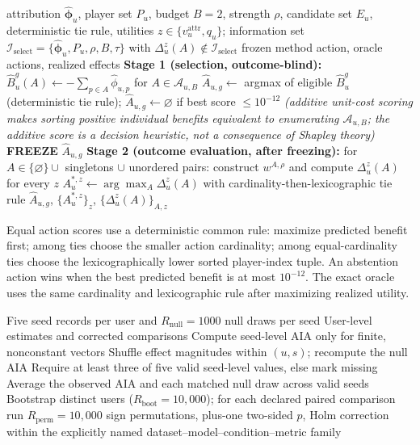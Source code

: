\documentclass[a4paper,fleqn,doubleblind]{cas-sc}
\begin{document}
\begin{algorithm}[t]
\caption{Leakage-free signed action selection and exact budget-two oracle}
\label{alg:actions}
\begin{algorithmic}[1]
\Require attribution $\hat{\boldsymbol\phi}_u$, player set $P_u$, budget $B=2$, strength $\rho$, candidate set $E_u$, deterministic tie rule, utilities $z\in\{v_u^{\mathrm{attr}},q_u\}$; information set $\mathcal I_{\mathrm{select}}=\{\hat{\boldsymbol\phi}_u,P_u,\rho,B,\tau\}$ with $\Delta_u^z(A)\notin\mathcal I_{\mathrm{select}}$
\Ensure frozen method action, oracle actions, realized effects
\State \textbf{Stage 1 (selection, outcome-blind):} $\widehat B_u^g(A)\gets-\sum_{p\in A}\hat\phi_{u,p}$ for $A\in\mathcal A_{u,B}$
\State $\widehat A_{u,g}\gets$ argmax of eligible $\widehat B_u^g$ (deterministic tie rule); $\widehat A_{u,g}\gets\varnothing$ if best score $\le10^{-12}$
\Statex\hspace{1em}\textit{(additive unit-cost scoring makes sorting positive individual benefits equivalent to enumerating $\mathcal A_{u,B}$; the additive score is a decision heuristic, not a consequence of Shapley theory)}
\State \textbf{FREEZE} $\widehat A_{u,g}$
\State \textbf{Stage 2 (outcome evaluation, after freezing):} for $A\in\{\varnothing\}\cup$ singletons $\cup$ unordered pairs: construct $w^{A,\rho}$ and compute $\Delta_u^z(A)$ for every $z$
\State $A_u^{*,z}\gets\arg\max_A\Delta_u^z(A)$ with cardinality-then-lexicographic tie rule
\State \Return $\widehat A_{u,g}$, $\{A_u^{*,z}\}_z$, $\{\Delta_u^z(A)\}_{A,z}$
\end{algorithmic}
\end{algorithm}

Equal action scores use a deterministic common rule: maximize predicted benefit first; among ties choose the smaller action cardinality; among equal-cardinality ties choose the lexicographically lower sorted player-index tuple. An abstention action wins when the best predicted benefit is at most $10^{-12}$. The exact oracle uses the same cardinality and lexicographic rule after maximizing realized utility.

\begin{algorithm}[t]
\caption{Distinct-user inference and AIA null}
\label{alg:inference}
\begin{algorithmic}[1]
\Require Five seed records per user and $R_{\mathrm{null}}=1000$ null draws per seed
\Ensure User-level estimates and corrected comparisons
\State Compute seed-level AIA only for finite, nonconstant vectors
\State Shuffle effect magnitudes within $(u,s)$; recompute the null AIA
\EndFor
\EndFor
{}
\State Require at least three of five valid seed-level values, else mark missing
\State Average the observed AIA and each matched null draw across valid seeds
\EndFor
\State Bootstrap distinct users ($R_{\mathrm{boot}}=10{,}000$); for each declared paired comparison run $R_{\mathrm{perm}}=10{,}000$ sign permutations, plus-one two-sided $p$, Holm correction within the explicitly named dataset--model--condition--metric family
\end{algorithmic}
\end{algorithm}
\end{document}
